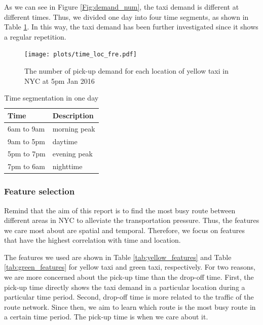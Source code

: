 \documentclass[11pt]{article}
\begin{document}
As we can see in Figure \ref{Fig:demand_num}, the taxi demand is different at different times. Thus, we divided one day into four time segments, as shown in Table \ref{tab:time_seg}. In this way, the taxi demand has been further investigated since it shows a regular repetition.



\begin{figure}[ht]
\texttt{[image: plots/time\_loc\_fre.pdf]}
\centering
\caption{The number of pick-up demand for each location of yellow taxi in NYC at 5pm Jan 2016}
\label{Fig:time_loc_fre}
\end{figure}


\begin{table}[h]
\centering
\begin{tabular}{ll}
\hline
Time & Description \\\hline
6am to 9am &morning peak\\
9am to 5pm & daytime \\
5pm to 7pm & evening peak \\
7pm to 6am & nighttime \\\hline
\end{tabular}
\caption{Time segmentation in one day}
\label{tab:time_seg}
\end{table}



\subsubsection{Feature selection}
\label{sec:feature_selection}
Remind that the aim of this report is to find the most busy route between different areas in NYC to alleviate the transportation pressure. Thus, the features we care most about are spatial and temporal. Therefore, we focus on features that have the highest correlation with time and location.

The features we used are shown in Table \ref{tab:yellow_features} and Table \ref{tab:green_features} for yellow taxi and green taxi, respectively. For two reasons, we are more concerned about the pick-up time than the drop-off time. First, the pick-up time directly shows the taxi demand in a particular location during a particular time period. Second, drop-off time is more related to the traffic of the route network. Since then, we aim to learn which route is the most busy route in a certain time period. The pick-up time is when we care about it.
\end{document}
